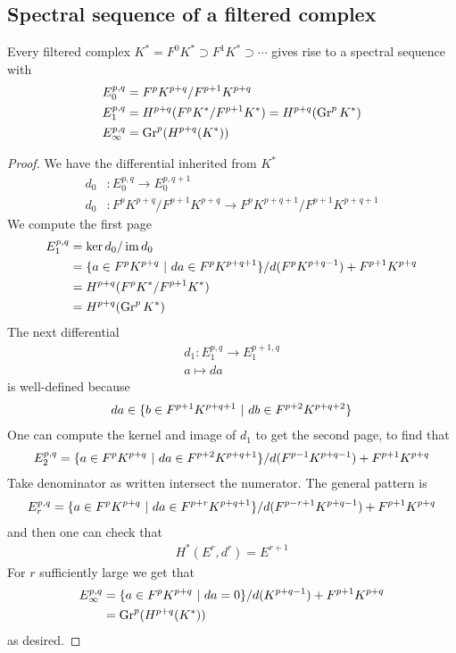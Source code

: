 \subsection{Spectral sequence of a filtered complex}
\begin{proposition}
    Every filtered complex $K^* = F^0K^* \supset F^1K^* \supset \cdots$ gives rise 
    to a spectral sequence with \begin{align*}
        E_0^{p,q} &= F^pK^{p+q}/F^{p+1}K^{p+q} \\
        E_1^{p,q} &= H^{p+q}(F^pK^*/F^{p+1}K^*) = H^{p+q}(\operatorname{Gr}^p K^*) \\
        E_\infty^{p,q} &= \operatorname{Gr}^p(H^{p+q}(K^*))
    \end{align*}
\end{proposition}
\begin{proof}
    We have the differential inherited from $K^*$ \begin{align*}
        d_0&: E_0^{p,q} \to E_0^{p,q+1} \\
        d_0&: F^pK^{p+q}/F^{p+1}K^{p+q} \to F^pK^{p+q+1}/F^{p+1}K^{p+q+1}
    \end{align*}  We compute 
    the first page \begin{align*}
        E_1^{p,q} &= \ker d_0 / \operatorname{im} d_0 \\
        &= \{a\in F^pK^{p+q} \ \vert \  da \in F^pK^{p+q+1}\} / d(F^pK^{p+q-1}) + F^{p+1}K^{p+q} \\
        &= H^{p+q}(F^pK^*/F^{p+1}K^*) \\
        &= H^{p+q}(\operatorname{Gr}^p K^*)
    \end{align*} The next differential \begin{align*}
        d_1: E_1^{p,q} \to E_1^{p+1,q} \\
        a \mapsto da
    \end{align*} is well-defined because \begin{align*}
        da \in \{b\in F^{p+1}K^{p+q+1} \ \vert \  db \in F^{p+2}K^{p+q+2}\}
    \end{align*} One can compute the kernel and image of $d_1$ to get the second page,
    to find that \begin{align*}
        E_2^{p,q} = \{a \in F^pK^{p+q} \ \vert \  da \in F^{p+2}K^{p+q+1}\} / d(F^{p-1}K^{p+q-1}) + F^{p+1}K^{p+q}
    \end{align*} Take denominator as written intersect the numerator. The general pattern is \begin{align*}
        E_r^{p,q} = \{a \in F^pK^{p+q} \ \vert \  da \in F^{p+r}K^{p+q+1}\} / d(F^{p-r+1}K^{p+q-1}) + F^{p+1}K^{p+q}
    \end{align*} and then one can check that \begin{align*}
        H^*(E^r,d^r) = E^{r+1}
    \end{align*} For $r$ sufficiently large we get that \begin{align*}
        E_\infty^{p,q} &= \{a\in F^pK^{p+q} \ \vert \  da = 0\} / d(K^{p+q-1}) + F^{p+1}K^{p+q} \\
        &= \operatorname{Gr}^p(H^{p+q}(K^*))
    \end{align*} as desired.
\end{proof}
